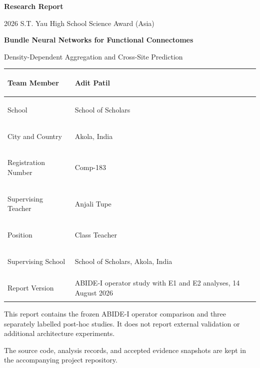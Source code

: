 \documentclass[11pt,a4paper]{article}
\newcommand{\draftnote}{This report contains the frozen ABIDE-I operator comparison and three separately labelled post-hoc studies. It does not report external validation or additional architecture experiments.}
\begin{document}
\hypersetup{pageanchor=false}

\thispagestyle{empty}
\begin{center}
  {\Large\bfseries Research Report}\par
  \vspace{0.35em}
  {\large 2026 S.T. Yau High School Science Award (Asia)}\par
  \vspace{2.0cm}
  {\LARGE\bfseries Bundle Neural Networks for Functional Connectomes}\par
  \vspace{0.35em}
  {\Large Density-Dependent Aggregation and Cross-Site Prediction}\par
  \vspace{1.2cm}
\end{center}

\renewcommand{\arraystretch}{1.35}
\noindent\begin{tabularx}{\textwidth}{|>{\bfseries\raggedright\arraybackslash}p{3.6cm}|Y|}
\hline
Team Member & Adit Patil \\
\hline
School & School of Scholars \\
\hline
City and Country & Akola, India \\
\hline
Registration Number & Comp-183 \\
\hline
Supervising Teacher & Anjali Tupe \\
\hline
Position & Class Teacher \\
\hline
Supervising School & School of Scholars, Akola, India \\
\hline
Report Version & ABIDE-I operator study with E1 and E2 analyses, 14 August 2026 \\
\hline
\end{tabularx}

\vfill
\noindent\begin{minipage}{\textwidth}
\small\color{muted}
\draftnote

The source code, analysis records, and accepted evidence snapshots are kept in
the accompanying project repository.
\end{minipage}
\clearpage

\hypersetup{pageanchor=true}
\setcounter{page}{1}
\end{document}
